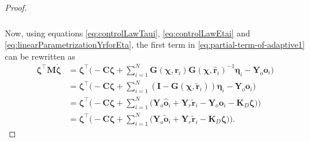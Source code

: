 \begin{proof}
\begin{align}
\begin{split}
    \end{split} \label{eq:partial-term-of-adaptive1}
    \end{align} 
    Now, using equations \eqref{eq:controlLawTaui}, \eqref{eq:controlLawEtai} and \eqref{eq:linearParametrizationYrforEta}, the first term in \eqref{eq:partial-term-of-adaptive1} can be rewritten as
    \begin{align}
        \boldsymbol{\zeta}^\top \mathbf {M} \dot{\boldsymbol{\zeta}} &= \boldsymbol{\zeta}^\top\Biggl( - \mathbf{C}\boldsymbol{\zeta} + \sum_{i=1}^N\mathbf{G}(\boldsymbol{\chi}, \mathbf{r}_i)\mathbf{G}(\boldsymbol{\chi}, \hat{\mathbf{r}}_i)^{-1}\boldsymbol{\eta}_i - \mathbf{Y}_o\mathbf{o}_i\Biggr)\\
        &= \boldsymbol{\zeta}^\top\Biggl(- \mathbf{C}\boldsymbol{\zeta}+\sum_{i=1}^N(\mathbf{I}-\mathbf{G}(\boldsymbol{\chi}, \widetilde{\mathbf{r}}_i))\boldsymbol{\eta}_i - \mathbf{Y}_o\mathbf{o}_i \Biggr)\\
        &= \boldsymbol{\zeta}^\top\Biggl(- \mathbf{C}\boldsymbol{\zeta} + \sum_{i=1}^N \biggl( \mathbf{Y}_o\hat{\mathbf{o}}_i + \mathbf{Y}_r\widetilde{\mathbf{r}}_i - \mathbf{Y}_o\mathbf{o}_i- \mathbf{K}_D\boldsymbol{\zeta}\biggr) \Biggr)\\
        &= \boldsymbol{\zeta}^\top\Biggl(- \mathbf{C}\boldsymbol{\zeta} + \sum_{i=1}^N\biggl( \mathbf{Y}_o\widetilde{\mathbf{o}}_i + \mathbf{Y}_r\widetilde{\mathbf{r}}_i - \mathbf{K}_D\boldsymbol{\zeta}\biggr) \Biggr). \label{eq:partial-term-of-adaptive2}
    \end{align}


\end{proof}
